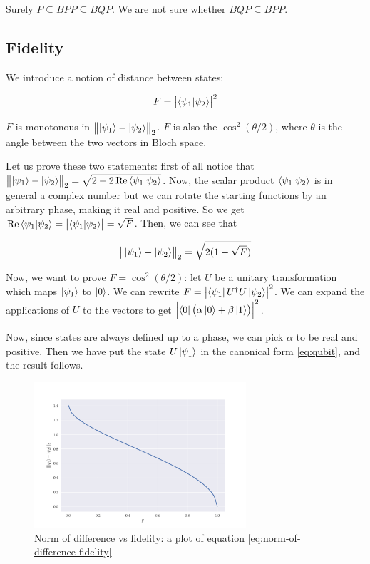 \documentclass[main.tex]{subfiles}
\begin{document}
Surely \(P \subseteq BPP \subseteq BQP\). We are not sure whether \(BQP \subseteq BPP\).

\subsection{Fidelity}

We introduce a notion of distance between states:

\begin{equation}
    F = \abs{\braket{\psi_1}{\psi_2} }^2
\end{equation}

\(F\) is monotonous in \(\norm{\ket{\psi_1} - \ket{\psi _2} }_2\).
\(F\) is also the \(\cos^2(\theta/2) \), where \(\theta\) is the angle between the two vectors in Bloch space.

\begin{bluebox}
  Let us prove these two statements: first of all notice that \(\norm{\ket{\psi_1} - \ket{\psi _2} }_2 = \sqrt{2 - 2 \Re \braket{\psi_1}{\psi_2}}\).
  Now, the scalar product \(\braket{\psi_1}{\psi_2}\) is in general a complex number but we can rotate the starting functions by an arbitrary phase, making it real and positive. So we get \(\Re \braket{\psi_1}{\psi_2} = \abs{\braket{\psi_1}{\psi_2}}  = \sqrt{F} \). Then, we can see that

  \begin{equation} \label{eq:norm-of-difference-fidelity}
    \norm{\ket{\psi_1} - \ket{\psi _2} }_2 = \sqrt{2(1-\sqrt{F})}
  \end{equation}

  Now, we want to prove \(F = \cos^2(\theta/2) \): let \(U\) be a unitary transformation which maps \(\ket{\psi _1} \) to \(\ket{0}\). We can rewrite \(F = \abs{\bra{\psi_1} U^\dag U \ket{\psi_2}}^2\). We can expand the applications of \(U\) to the vectors to get \(\abs{\bra{0} \qty(\alpha \ket{0} + \beta \ket{1} ) }^2\).

  Now, since states are always defined up to a phase, we can pick \(\alpha\) to be real and positive. Then we have put the state \(U \ket{\psi_1}\) in the canonical form \eqref{eq:qubit}, and the result follows.
\end{bluebox}

\begin{figure}
    \centering
    \includegraphics[width=0.7\textwidth]{figures/Fidelity.pdf}
    \caption{Norm of difference vs fidelity: a plot of equation \eqref{eq:norm-of-difference-fidelity}}
    \label{fig:fidelity}
\end{figure}
\end{document}
